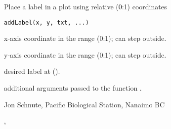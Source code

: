 \documentclass[letterpaper]{book}
\begin{document}
\begin{Description}\relax
Place a label in a plot using relative (0:1) coordinates
\end{Description}
\begin{Usage}
\begin{verbatim}
addLabel(x, y, txt, ...)
\end{verbatim}
\end{Usage}
\begin{Arguments}
\begin{ldescription}
\item[\code{x}] x-axis coordinate in the range (0:1); can step outside.
\item[\code{y}] y-axis coordinate in the range (0:1); can step outside.
\item[\code{txt}] desired label at ().
\item[\code{...}] additional arguments passed to the function .
\end{ldescription}
\end{Arguments}
\begin{Author}\relax
Jon Schnute, Pacific Biological Station, Nanaimo BC
\end{Author}
\begin{SeeAlso}\relax
{}, 
\end{SeeAlso}
\begin{Examples}
\end{Examples}
\end{document}
